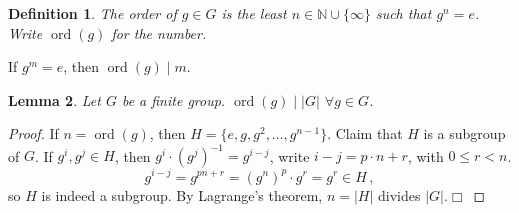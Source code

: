 \documentclass{article}
\theoremstyle{plain}\theoremheaderfont{\normalfont\itshape}\theorembodyfont{\rmfamily}\theoremseparator{.}\newtheorem*{rem}{Remark}\newtheorem*{ex}{Example}\newtheorem*{proof}{Proof}\newtheorem*{altp}{Alternative proof}\newtheorem*{nonex}{Non-Example}
\theoremstyle{plain}\theoremheaderfont{\normalfont\bfseries}\theorembodyfont{\rmfamily}\theoremseparator{.}\newtheorem{thm}{Theorem}[section]\newtheorem{lem}[thm]{Lemma}\newtheorem{prop}[thm]{Proposition}\newtheorem*{cor}{Corollary}\newtheorem{defn}[thm]{Definition}\newtheorem{clm}[thm]{Claim}\newtheorem{clminproof}{Claim}\newtheorem*{notn}{Notation}\newtheorem*{exer}{Exercise}\newtheorem*{lemnn}{Lemma}
\theoremstyle{break}\theoremheaderfont{\normalfont\itshape}\theorembodyfont{\rmfamily}\theoremseparator{.\medskip}\newtheorem*{proofskip}{Proof}\newtheorem*{exs}{Examples}\newtheorem*{rems}{Remarks}\newtheorem*{obs}{Observations}
\theoremstyle{break}\theoremheaderfont{\normalfont\bfseries}\theorembodyfont{\rmfamily}\theoremseparator{.\medskip}\newtheorem{lemskip}[thm]{Lemma}\newtheorem{defnskip}[thm]{Definition}\newtheorem{propskip}[thm]{Proposition}\newtheorem{thmskip}[thm]{Theorem}
\numberwithin{equation}{section}
\newcommand{\qed}{\hfill\ensuremath{\Box}}
\newcommand{\abs}[1]{\left|#1\right|}
\DeclareMathOperator*{\ord}{ord}
\newcommand{\NN}{\mathbb{N}}
\begin{document}
    \begin{defn}
        The \textit{order} of \(g\in G\) is the least \(n\in\NN\cup\{\infty\}\) such that \(g^n=e\). Write \(\ord(g)\) for the number.
    \end{defn}
    If \(g^m=e\), then \(\ord(g)\mid m\).
    \begin{lem}
        Let \(G\) be a finite group. \(\ord(g)\mid\abs{G}\) \(\forall g\in G\).
    \end{lem}
    \begin{proof}
        If \(n=\ord(g)\), then \(H=\{e,g,g^2,\dots,g^{n-1}\}\). Claim that \(H\) is a subgroup of \(G\). If \(g^i,g^j\in H\), then \(g^i\cdot(g^j)^{-1}=g^{i-j}\), write \(i-j=p\cdot n+r\), with \(0\le r< n\).
        \[g^{i-j}=g^{pn+r}=(g^n)^p\cdot g^r=g^r\in H\,,\]
        so \(H\) is indeed a subgroup. By Lagrange's theorem, \(n=\abs{H}\) divides \(\abs{G}\).\qed
    \end{proof}
\end{document}
